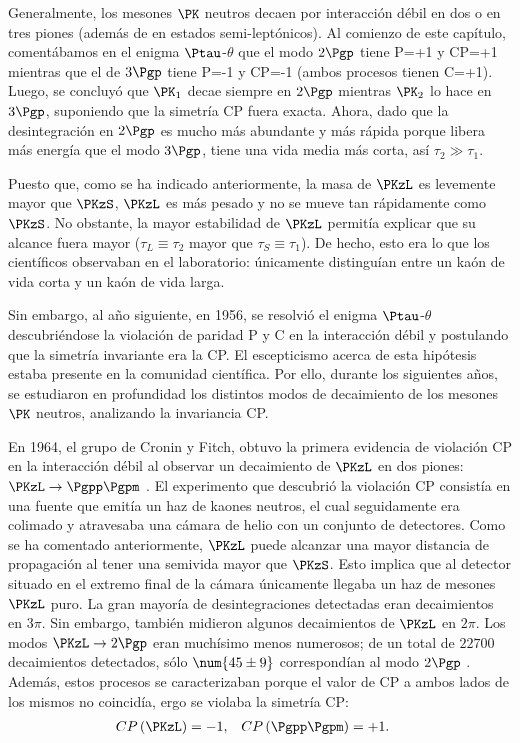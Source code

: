 Generalmente, los mesones $\PK$ neutros decaen por interacción débil en dos o en tres piones (además de en estados semi-leptónicos). Al comienzo de este capítulo, comentábamos en el enigma $\Ptau$-$\theta$ que el modo $2\Pgp$ tiene P=+1 y CP=+1 mientras que el de $3\Pgp$ tiene P=-1 y CP=-1 (ambos procesos tienen C=+1). Luego, se concluyó que $\PK_{1}$ decae siempre en $2\Pgp$ mientras $\PK_{2}$ lo hace en $3\Pgp$, suponiendo que la simetría CP fuera exacta. Ahora, dado que la desintegración en $2\Pgp$ es mucho más abundante y más rápida porque libera más energía que el modo $3\Pgp$, tiene una vida media más corta, así $\tau_{2} \gg \tau_{1}$. 

Puesto que, como se ha indicado anteriormente, la masa de $\PKzL$ es levemente mayor que $\PKzS$, $\PKzL$ es más pesado y no se mueve tan rápidamente como $\PKzS$. No obstante, la mayor estabilidad de $\PKzL$ permitía explicar que su alcance fuera mayor ($\tau_{L}\equiv \tau_{2}$ mayor que $\tau_{S} \equiv \tau_{1}$). De hecho, esto era lo que los científicos observaban en el laboratorio: únicamente distinguían entre un kaón de vida corta y un kaón de vida larga.

Sin embargo, al año siguiente, en 1956, se resolvió el enigma $\Ptau$-$\theta$ descubriéndose la violación de paridad P y C en la interacción débil y postulando que la simetría invariante era la CP. El escepticismo acerca de esta hipótesis estaba presente en la comunidad científica. Por ello, durante los siguientes años, se estudiaron en profundidad los distintos modos de decaimiento de los mesones $\PK$ neutros, analizando la invariancia CP.

En 1964, el grupo de Cronin y Fitch, obtuvo la primera evidencia de violación CP en la interacción débil al observar un decaimiento de $\PKzL$ en dos piones: $\PKzL \rightarrow \Pgpp\Pgpm$ \cite{Cronin}. El experimento que descubrió la violación CP consistía en una fuente que emitía un haz de kaones neutros, el cual seguidamente era colimado y atravesaba una cámara de helio con un conjunto de detectores. Como se ha comentado anteriormente, $\PKzL$ puede alcanzar una mayor distancia de propagación al tener una semivida mayor que $\PKzS$. Esto implica que al detector situado en el extremo final de la cámara únicamente llegaba un haz de mesones $\PKzL$ puro. La gran mayoría de desintegraciones detectadas eran decaimientos en $3\pi$. Sin embargo, también midieron algunos decaimientos de $\PKzL$ en $2\pi$. Los modos $\PKzL \rightarrow 2\Pgp$ eran muchísimo menos numerosos; de un total de $\num{22700}$ decaimientos detectados, sólo $\num{45 \pm 9}$ correspondían al modo $2\Pgp$ \cite{Cronin}. Además, estos procesos se caracterizaban porque el valor de CP a ambos lados de los mismos no coincidía, ergo se violaba la simetría CP:
\begin{align}
CP\left(\PKzL\right) &=-1, & CP\left(\Pgpp\Pgpm\right) &= +1.
\end{align}

